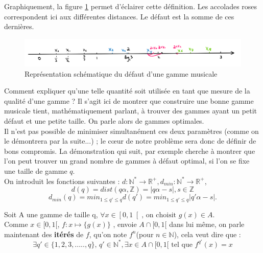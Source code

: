 \documentclass[moyen]{classeUPD}
\begin{document}
Graphiquement, la figure \ref{figure 4} permet d'éclairer cette définition. Les accolades roses correspondent ici aux différentes distances. Le défaut est la somme de ces dernières.
 
\begin{figure}[h!]
	\begin{center}
		\includegraphics[width=0.7\textheight]{picture1}
		\caption[Défaut d'une gamme musicale]{Représentation schématique du défaut d'une gamme musicale}
		\label{figure 4}
	\end{center}
\end{figure}

Comment expliquer qu’une telle quantité soit utilisée en tant que mesure de la qualité d’une gamme ? Il s’agit ici de montrer que construire une bonne gamme musicale tient, mathématiquement parlant, à trouver des gammes ayant un petit défaut et une petite taille. On parle alors de gammes optimales.\\
Il n’est pas possible de minimiser simultanément ces deux paramètres (comme on le démontrera par la suite...) ; le cœur de notre problème sera donc de définir de bons compromis. La démonstration qui suit, par exemple cherche à montrer que l’on peut trouver un grand nombre de gammes à défaut optimal, si l’on se fixe une taille de gamme $q$.\\

On introduit les fonctions suivantes : $d: \mathbb{N^{*}} \longrightarrow \mathbb{R^{+}} ,d_{min} :\mathbb{N^{*}} \longrightarrow \mathbb{R^{+}} $,
$$d(q)=dist(q\alpha, \mathbb{Z})= \left|q\alpha  - s\right| ,s \in \mathbb{Z}$$
$$d_{min}(q) = min _{1 \le q' \le q} d(q') = min_{1 \le q' \le q} \left|q'\alpha - s\right| .$$

Soit A une gamme de taille q, 
$ \forall x \in \left[0,1\right[ 
\text{, on choisit } g(x)\in A$. \\
Comme $x \in [0,1[ $,  $f: x \mapsto  \{g(x)\}$  , envoie $A\cap [0,1[$ dans lui même, on parle maintenant des \textbf{itérés} de $f$, qu'on note $f^{n}$(pour $n \in \mathbb{N}$), cela veut dire que :
$$\exists q'\in \{1,2,3,.....,q\} \text{, } q'\in \mathbb{N^{*}},\exists x \in A \cap [0,1[ \text{ tel que } f^{q'}(x) = x$$
\end{document}
